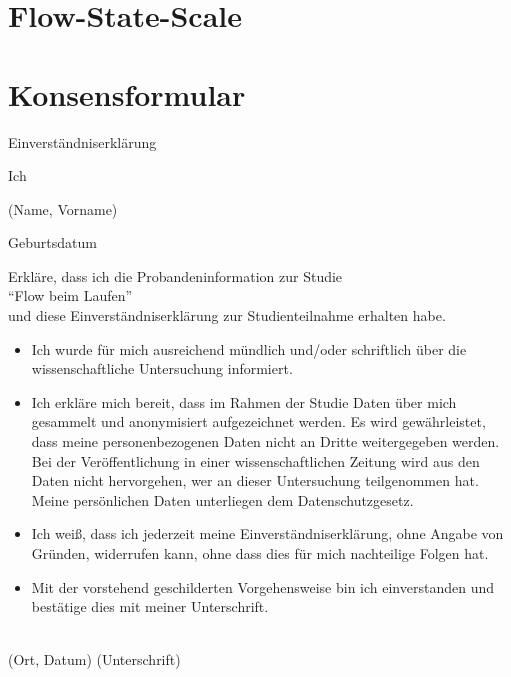 
\section{Flow-State-Scale} %
\label{sec:flow_state_scale}

\pagebreak
\section{Konsensformular}

{\Huge Einverständniserklärung}\\
\begin{singlespace}
Ich \hrulefill									
\begin{center}				
	(Name, Vorname) 
\end{center}
Geburtsdatum \hrulefill							

\begin{center}	
Erkläre, dass ich die Probandeninformation zur Studie\\ 
"`Flow beim Laufen"'\\
und diese Einverständniserklärung zur Studienteilnahme erhalten habe. 
\end{center}

\begin{itemize}
	\item Ich wurde für mich ausreichend mündlich und/oder schriftlich über die wissenschaftliche Untersuchung informiert. 
	\item Ich erkläre mich bereit, dass im Rahmen der Studie Daten über mich gesammelt und anonymisiert aufgezeichnet werden. Es wird gewährleistet, dass meine personenbezogenen Daten nicht an Dritte weitergegeben werden. Bei der Veröffentlichung in einer wissenschaftlichen Zeitung wird aus den Daten nicht hervorgehen, wer an dieser Untersuchung teilgenommen hat. Meine persönlichen Daten unterliegen dem Datenschutzgesetz. 
	\item Ich weiß, dass ich jederzeit meine Einverständniserklärung, ohne Angabe von Gründen, widerrufen kann, ohne dass dies für mich nachteilige Folgen hat. 
	\item Mit der vorstehend geschilderten Vorgehensweise bin ich einverstanden und bestätige dies mit meiner Unterschrift. 
\end{itemize}
\vspace{15mm}
\hrulefill \\						
(Ort, Datum) \hspace{20mm} (Unterschrift) 
\end{singlespace}
